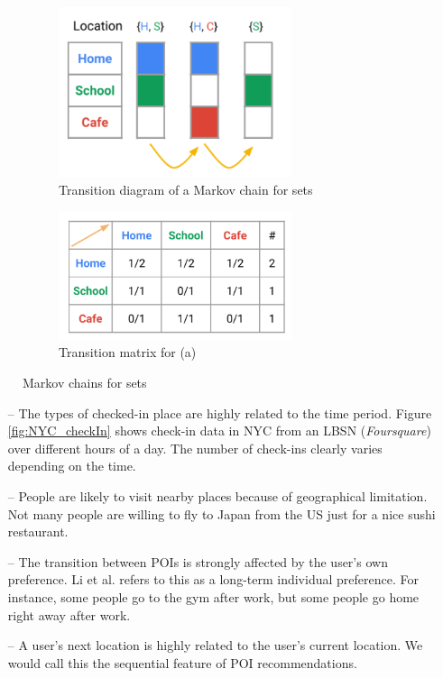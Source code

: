 \documentclass{sig-alternate}
\begin{document}
\begin{figure}
\begin{subfigure}{.5\textwidth}
  \centering
  \includegraphics[width=0.75\textwidth]{MCforSets.png}
  \caption{Transition diagram of a Markov chain for sets}
  \label{fig:MCSets}
\end{subfigure}%
\begin{subfigure}{.5\textwidth}
  \centering
  \includegraphics[width=0.75\textwidth]{MCforSetsM.png}
  \caption{Transition matrix for (a)}
  \label{fig:MCSetsM}
\end{subfigure}
\caption{Markov chains for sets}
\label{fig:ex}
\end{figure}


\begin{itemize}
\item[--] The types of checked-in place are highly related to the time period. Figure \ref{fig:NYC_checkIn} shows check-in data in 
NYC from an LBSN (\emph{Foursquare}) over different hours of a day. The number of check-ins clearly varies depending 
on the time.
\item[--] People are likely to visit nearby places because of geographical limitation. Not many people are willing 
to fly to Japan from the US just for a nice sushi restaurant. \cite{Li:2017}
\item[--] The transition between POIs is strongly affected by the user's own preference. Li et al. \cite{Li:2017} refers to this as a long-term individual preference. For instance, some people go to the gym after work, but some people go home right away after work. 
\item[--] A user's next location is highly related to the user's current location. We would call this the sequential feature of POI recommendations. 
\end{itemize}
\end{document}
